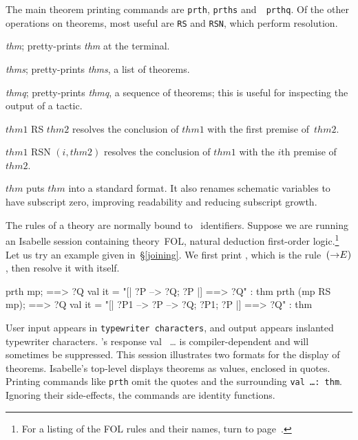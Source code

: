 The main theorem printing commands are \texttt{prth}, \texttt{prths} and~{\tt
  prthq}.  Of the other operations on theorems, most useful are \texttt{RS}
and \texttt{RSN}, which perform resolution.

\begin{ttdescription}
\item[\ttindex{prth} {\it thm};]
  pretty-prints {\it thm\/} at the terminal.

\item[\ttindex{prths} {\it thms};]
  pretty-prints {\it thms}, a list of theorems.

\item[\ttindex{prthq} {\it thmq};]
  pretty-prints {\it thmq}, a sequence of theorems; this is useful for
  inspecting the output of a tactic.

\item[$thm1$ RS $thm2$]  
  resolves the conclusion of $thm1$ with the first premise of~$thm2$.

\item[$thm1$ RSN $(i,thm2)$]  
  resolves the conclusion of $thm1$ with the $i$th premise of~$thm2$.

\item[\ttindex{standard} $thm$]  
  puts $thm$ into a standard format.  It also renames schematic variables
  to have subscript zero, improving readability and reducing subscript
  growth.
\end{ttdescription}
The rules of a theory are normally bound to \ML\ identifiers.  Suppose we are
running an Isabelle session containing theory~FOL, natural deduction
first-order logic.\footnote{For a listing of the FOL rules and their \ML{}
  names, turn to
%
           {page~\pageref{fol-rules}}.}
Let us try an example given in~\S\ref{joining}.  We
first print , which is the rule~$({\rightarrow}E)$, then resolve it with
itself.
\begin{ttbox} 
prth mp; 
{\out [| ?P --> ?Q; ?P |] ==> ?Q}
{\out val it = "[| ?P --> ?Q; ?P |] ==> ?Q" : thm}
prth (mp RS mp);
{\out [| ?P1 --> ?P --> ?Q; ?P1; ?P |] ==> ?Q}
{\out val it = "[| ?P1 --> ?P --> ?Q; ?P1; ?P |] ==> ?Q" : thm}
\end{ttbox}
User input appears in {\footnotesize\tt typewriter characters}, and output
appears in{\out slanted typewriter characters}.  \ML's response {\out val
  }~\ldots{} is compiler-dependent and will sometimes be suppressed.  This
session illustrates two formats for the display of theorems.  Isabelle's
top-level displays theorems as \ML{} values, enclosed in quotes.  Printing
commands like \texttt{prth} omit the quotes and the surrounding \texttt{val
  \ldots :\ thm}.  Ignoring their side-effects, the commands are identity
functions.

